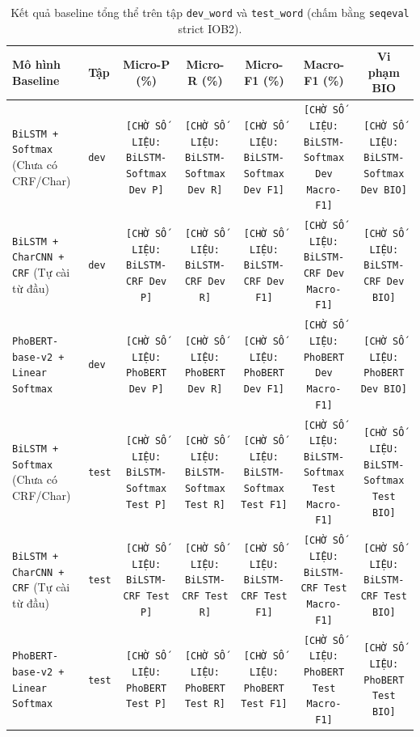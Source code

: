\documentclass[11pt,a4paper,twocolumn]{article}
\begin{document}
\begin{table}[t]
\centering
\small
\begin{tabular}{llccccc}
\hline
\textbf{Mô hình Baseline} & \textbf{Tập} & \textbf{Micro-P (\%)} & \textbf{Micro-R (\%)} & \textbf{Micro-F1 (\%)} & \textbf{Macro-F1 (\%)} & \textbf{Vi phạm BIO} \\
\hline
\texttt{BiLSTM + Softmax} (Chưa có CRF/Char) & \texttt{dev} & \texttt{[CHỜ SỐ LIỆU: BiLSTM-Softmax Dev P]} & \texttt{[CHỜ SỐ LIỆU: BiLSTM-Softmax Dev R]} & \texttt{[CHỜ SỐ LIỆU: BiLSTM-Softmax Dev F1]} & \texttt{[CHỜ SỐ LIỆU: BiLSTM-Softmax Dev Macro-F1]} & \texttt{[CHỜ SỐ LIỆU: BiLSTM-Softmax Dev BIO]} \\
\texttt{BiLSTM + CharCNN + CRF} (Tự cài từ đầu) & \texttt{dev} & \texttt{[CHỜ SỐ LIỆU: BiLSTM-CRF Dev P]} & \texttt{[CHỜ SỐ LIỆU: BiLSTM-CRF Dev R]} & \texttt{[CHỜ SỐ LIỆU: BiLSTM-CRF Dev F1]} & \texttt{[CHỜ SỐ LIỆU: BiLSTM-CRF Dev Macro-F1]} & \texttt{[CHỜ SỐ LIỆU: BiLSTM-CRF Dev BIO]} \\
\texttt{PhoBERT-base-v2 + Linear Softmax} & \texttt{dev} & \texttt{[CHỜ SỐ LIỆU: PhoBERT Dev P]} & \texttt{[CHỜ SỐ LIỆU: PhoBERT Dev R]} & \texttt{[CHỜ SỐ LIỆU: PhoBERT Dev F1]} & \texttt{[CHỜ SỐ LIỆU: PhoBERT Dev Macro-F1]} & \texttt{[CHỜ SỐ LIỆU: PhoBERT Dev BIO]} \\
\hline
\texttt{BiLSTM + Softmax} (Chưa có CRF/Char) & \texttt{test} & \texttt{[CHỜ SỐ LIỆU: BiLSTM-Softmax Test P]} & \texttt{[CHỜ SỐ LIỆU: BiLSTM-Softmax Test R]} & \texttt{[CHỜ SỐ LIỆU: BiLSTM-Softmax Test F1]} & \texttt{[CHỜ SỐ LIỆU: BiLSTM-Softmax Test Macro-F1]} & \texttt{[CHỜ SỐ LIỆU: BiLSTM-Softmax Test BIO]} \\
\texttt{BiLSTM + CharCNN + CRF} (Tự cài từ đầu) & \texttt{test} & \texttt{[CHỜ SỐ LIỆU: BiLSTM-CRF Test P]} & \texttt{[CHỜ SỐ LIỆU: BiLSTM-CRF Test R]} & \texttt{[CHỜ SỐ LIỆU: BiLSTM-CRF Test F1]} & \texttt{[CHỜ SỐ LIỆU: BiLSTM-CRF Test Macro-F1]} & \texttt{[CHỜ SỐ LIỆU: BiLSTM-CRF Test BIO]} \\
\texttt{PhoBERT-base-v2 + Linear Softmax} & \texttt{test} & \texttt{[CHỜ SỐ LIỆU: PhoBERT Test P]} & \texttt{[CHỜ SỐ LIỆU: PhoBERT Test R]} & \texttt{[CHỜ SỐ LIỆU: PhoBERT Test F1]} & \texttt{[CHỜ SỐ LIỆU: PhoBERT Test Macro-F1]} & \texttt{[CHỜ SỐ LIỆU: PhoBERT Test BIO]} \\
\hline
\end{tabular}
\caption{Kết quả baseline tổng thể trên tập \texttt{dev\_word} và \texttt{test\_word} (chấm bằng \texttt{seqeval} strict IOB2).}
\label{tab:ms_baseline}
\end{table}
\end{document}
